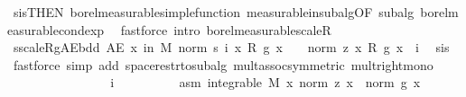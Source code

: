 \begin{isabellebody}
\ s{\isacharunderscore}{\kern0pt}is{\isacharparenleft}{\kern0pt}{}{\isacharparenright}{\kern0pt}{\isacharbrackleft}{\kern0pt}THEN\ borel{\isacharunderscore}{\kern0pt}measurable{\isacharunderscore}{\kern0pt}simple{\isacharunderscore}{\kern0pt}function{\isacharbrackright}{\kern0pt}\ measurable{\isacharunderscore}{\kern0pt}in{\isacharunderscore}{\kern0pt}subalg{\isacharbrackleft}{\kern0pt}OF\ subalg\ borel{\isacharunderscore}{\kern0pt}measurable{\isacharunderscore}{\kern0pt}cond{\isacharunderscore}{\kern0pt}exp{\isacharbrackright}{\kern0pt}\ \isamarkupfalse%
\ {\isacharparenleft}{\kern0pt}fastforce\ intro{\isacharcolon}{\kern0pt}\ borel{\isacharunderscore}{\kern0pt}measurable{\isacharunderscore}{\kern0pt}scaleR{\isacharparenright}{\kern0pt}\isanewline
\isanewline
\ \ \ \ \ \ \isamarkupfalse%
\ s{\isacharunderscore}{\kern0pt}scaleR{\isacharunderscore}{\kern0pt}g{\isacharunderscore}{\kern0pt}AE{\isacharunderscore}{\kern0pt}bdd{\isacharcolon}{\kern0pt}\ {\isachardoublequoteopen}AE\ x\ in\ M{\isachardot}{\kern0pt}\ norm\ {\isacharparenleft}{\kern0pt}s\ i\ x\ {\isacharasterisk}{\kern0pt}\isactrlsub R\ g\ x{\isacharparenright}{\kern0pt}\ {\isasymle}\ {}\ {\isacharasterisk}{\kern0pt}\ norm\ {\isacharparenleft}{\kern0pt}z\ x\ {\isacharasterisk}{\kern0pt}\isactrlsub R\ g\ x{\isacharparenright}{\kern0pt}{\isachardoublequoteclose}\ \ i\ \isamarkupfalse%
\ s{\isacharunderscore}{\kern0pt}is{\isacharparenleft}{\kern0pt}{}{\isacharparenright}{\kern0pt}\ \isamarkupfalse%
\ {\isacharparenleft}{\kern0pt}fastforce\ simp\ add{\isacharcolon}{\kern0pt}\ space{\isacharunderscore}{\kern0pt}restr{\isacharunderscore}{\kern0pt}to{\isacharunderscore}{\kern0pt}subalg\ mult{\isachardot}{\kern0pt}assoc{\isacharbrackleft}{\kern0pt}symmetric{\isacharbrackright}{\kern0pt}\ mult{\isacharunderscore}{\kern0pt}right{\isacharunderscore}{\kern0pt}mono{\isacharparenright}{\kern0pt}\isanewline
\ \ \ \ \ \ \isacommand{{\isacharbraceleft}{\kern0pt}}\isamarkupfalse%
\isanewline
\ \ \ \ \ \ \ \ \isamarkupfalse%
\ i\isanewline
\ \ \ \ \ \ \ \ \isamarkupfalse%
\ asm{\isacharcolon}{\kern0pt}\ {\isachardoublequoteopen}integrable\ M\ {\isacharparenleft}{\kern0pt}{\isasymlambda}x{\isachardot}{\kern0pt}\ norm\ {\isacharparenleft}{\kern0pt}z\ x{\isacharparenright}{\kern0pt}\ {\isacharasterisk}{\kern0pt}\ norm\ {\isacharparenleft}{\kern0pt}g\ x{\isacharparenright}{\kern0pt}{\isacharparenright}{\kern0pt}{\isachardoublequoteclose}\ \isamarkupfalse%

\end{isabellebody}

